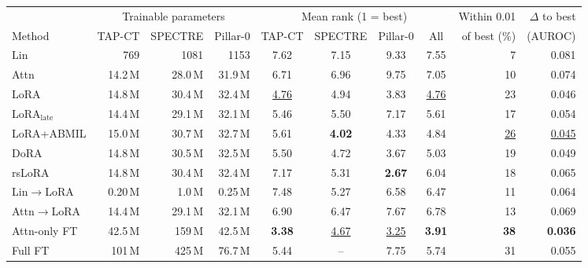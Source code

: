\begin{tabular}{lrrrccccrr}
\toprule
 & \multicolumn{3}{c}{Trainable parameters} & \multicolumn{4}{c}{Mean rank (1 = best)} & Within 0.01 & $\Delta$ to best \\
\cmidrule(lr){2-4}\cmidrule(lr){5-8}
Method & TAP-CT & SPECTRE & Pillar-0 & TAP-CT & SPECTRE & Pillar-0 & All & of best (\%) & (AUROC) \\
\midrule
Lin & 769 & 1081 & 1153 & 7.62 & 7.15 & 9.33 & 7.55 & 7 & 0.081 \\
Attn & 14.2\,M & 28.0\,M & 31.9\,M & 6.71 & 6.96 & 9.75 & 7.05 & 10 & 0.074 \\
LoRA & 14.8\,M & 30.4\,M & 32.4\,M & \underline{4.76} & 4.94 & 3.83 & \underline{4.76} & 23 & 0.046 \\
LoRA$_{\text{late}}$ & 14.4\,M & 29.1\,M & 32.1\,M & 5.46 & 5.50 & 7.17 & 5.61 & 17 & 0.054 \\
LoRA+ABMIL & 15.0\,M & 30.7\,M & 32.7\,M & 5.61 & \textbf{4.02} & 4.33 & 4.84 & \underline{26} & \underline{0.045} \\
DoRA & 14.8\,M & 30.5\,M & 32.5\,M & 5.50 & 4.72 & 3.67 & 5.03 & 19 & 0.049 \\
rsLoRA & 14.8\,M & 30.4\,M & 32.4\,M & 7.17 & 5.31 & \textbf{2.67} & 6.04 & 18 & 0.065 \\
Lin$\to$LoRA & 0.20\,M & 1.0\,M & 0.25\,M & 7.48 & 5.27 & 6.58 & 6.47 & 11 & 0.064 \\
Attn$\to$LoRA & 14.4\,M & 29.1\,M & 32.1\,M & 6.90 & 6.47 & 7.67 & 6.78 & 13 & 0.069 \\
Attn-only FT & 42.5\,M & 159\,M & 42.5\,M & \textbf{3.38} & \underline{4.67} & \underline{3.25} & \textbf{3.91} & \textbf{38} & \textbf{0.036} \\
Full FT & 101\,M & 425\,M & 76.7\,M & 5.44 & -- & 7.75 & 5.74 & 31 & 0.055 \\
\bottomrule
\end{tabular}
